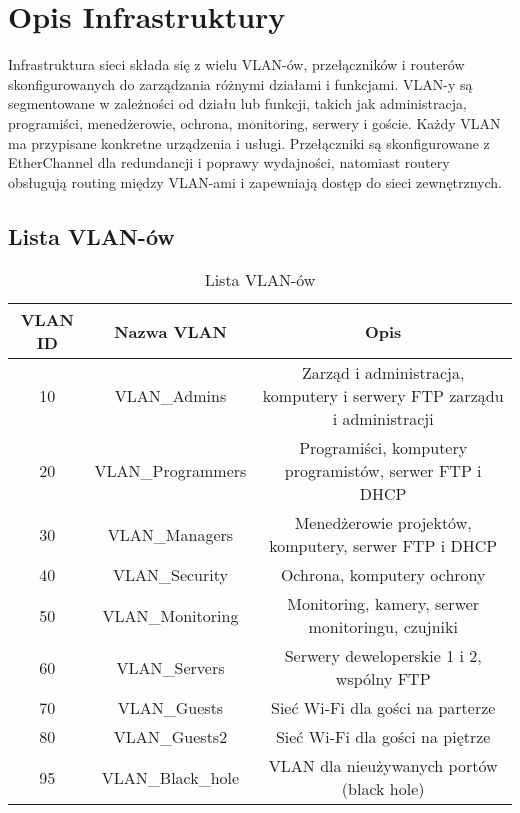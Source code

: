 \chapter{Opis Infrastruktury}

Infrastruktura sieci składa się z wielu VLAN-ów, przełączników i routerów skonfigurowanych do zarządzania różnymi działami i funkcjami. VLAN-y są segmentowane w zależności od działu lub funkcji, takich jak administracja, programiści, menedżerowie, ochrona, monitoring, serwery i goście. Każdy VLAN ma przypisane konkretne urządzenia i usługi. Przełączniki są skonfigurowane z EtherChannel dla redundancji i poprawy wydajności, natomiast routery obsługują routing między VLAN-ami i zapewniają dostęp do sieci zewnętrznych.

\section{Lista VLAN-ów}

\begin{table}[htbp]
\centering
\caption{Lista VLAN-ów}
\begin{tabular}{|c|c|c|}
\hline
\textbf{VLAN ID} & \textbf{Nazwa VLAN}            & \textbf{Opis}                              \\ \hline
10               & VLAN\_Admins                   & Zarząd i administracja, komputery i serwery FTP zarządu i administracji \\ \hline
20               & VLAN\_Programmers              & Programiści, komputery programistów, serwer FTP i DHCP \\ \hline
30               & VLAN\_Managers                 & Menedżerowie projektów, komputery, serwer FTP i DHCP \\ \hline
40               & VLAN\_Security                 & Ochrona, komputery ochrony                \\ \hline
50               & VLAN\_Monitoring               & Monitoring, kamery, serwer monitoringu, czujniki \\ \hline
60               & VLAN\_Servers                  & Serwery deweloperskie 1 i 2, wspólny FTP  \\ \hline
70               & VLAN\_Guests                   & Sieć Wi-Fi dla gości na parterze          \\ \hline
80               & VLAN\_Guests2                  & Sieć Wi-Fi dla gości na piętrze           \\ \hline
95               & VLAN\_Black\_hole              & VLAN dla nieużywanych portów (black hole) \\ \hline
\end{tabular}
\end{table}
\newpage

